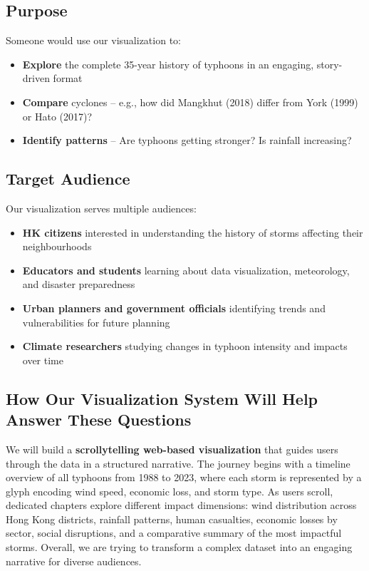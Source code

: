 \documentclass[a4paper,12pt]{article}
\begin{document}
\subsection{Purpose}

Someone would use our visualization to:
\begin{itemize}
    \item \textbf{Explore} the complete 35-year history of typhoons in an engaging, story-driven format
    \item \textbf{Compare} cyclones – e.g., how did Mangkhut (2018) differ from York (1999) or Hato (2017)?
    \item \textbf{Identify patterns} – Are typhoons getting stronger? Is rainfall increasing?


\end{itemize}

\subsection{Target Audience}

Our visualization serves multiple audiences:
\begin{itemize}
    \item \textbf{HK citizens} interested in understanding the history of storms affecting their neighbourhoods
    \item \textbf{Educators and students} learning about data visualization, meteorology, and disaster preparedness
    \item \textbf{Urban planners and government officials} identifying trends and vulnerabilities for future planning
    \item \textbf{Climate researchers} studying changes in typhoon intensity and impacts over time
\end{itemize}

\subsection{How Our Visualization System Will Help Answer These Questions}

We will build a \textbf{scrollytelling web-based visualization} that guides users through the data in a structured narrative. The journey begins with a timeline overview of all typhoons from 1988 to 2023, where each storm is represented by a glyph encoding wind speed, economic loss, and storm type. As users scroll, dedicated chapters explore different impact dimensions: wind distribution across Hong Kong districts, rainfall patterns, human casualties, economic losses by sector, social disruptions, and a comparative summary of the most impactful storms. Overall, we are trying to transform a complex dataset into an engaging narrative for diverse audiences.
\end{document}
